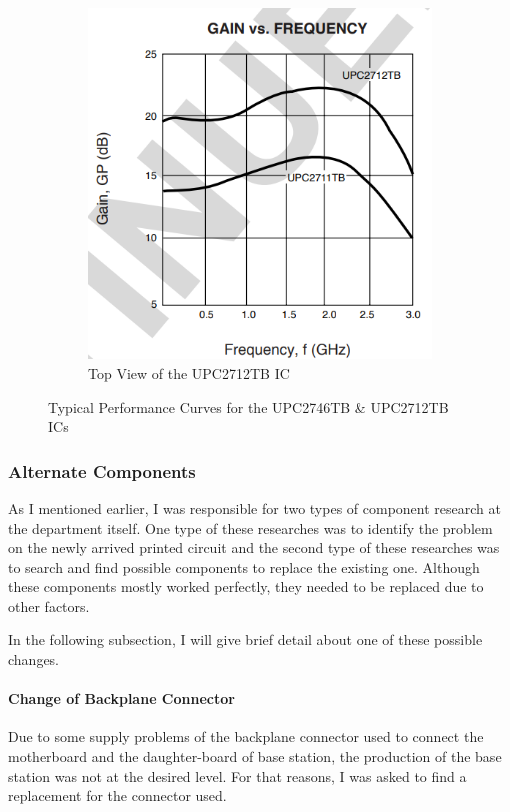 \begin{figure}[H]
\begin{subfigure}{.5\textwidth}
		\includegraphics[width=0.45\unitlength]{2712_perf}
  		\caption{\label{fig:2712perf}Top View of the UPC2712TB IC}
	\end{subfigure}
\caption{\label{fig:274612perf} Typical Performance Curves for the UPC2746TB \& UPC2712TB ICs   }
\end{figure}	


\subsubsection{Alternate Components}
\- \indent
	As I mentioned earlier, I was responsible for two types of component research at the department itself. One type of these researches was to identify the problem on the newly arrived printed circuit and the second type of these researches was to search and find possible components to replace the existing one. Although these components mostly worked perfectly, they needed to be replaced due to other factors. 	
	
	In the following subsection, I will give brief detail about one of these possible changes.
	
\paragraph{Change of Backplane Connector}
\- \indent
	Due to some supply problems of the backplane connector used to connect the motherboard and the daughter-board of base station, the production of the base station was not at the desired level. For that reasons, I was asked to find a replacement for the connector used.
	
